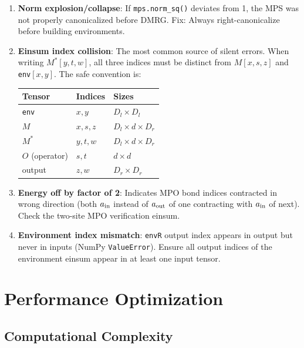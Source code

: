 \documentclass[aps,prb,onecolumn,scriptaddress]{revtex4-2}
\begin{document}
	\begin{enumerate}
		\item \textbf{Norm explosion/collapse}: If \texttt{mps.norm\_sq()} deviates
		from 1, the MPS was not properly canonicalized before DMRG.
		Fix: Always right-canonicalize before building environments.
		
		\item \textbf{Einsum index collision}: The most common source of silent errors.
		When writing $M^*[y,t,w]$, all three indices must be distinct from
		$M[x,s,z]$ and \texttt{env}$[x,y]$.
		The safe convention is:
		\begin{center}
			\begin{tabular}{lll}
				\toprule
				Tensor & Indices & Sizes \\
				\midrule
				\texttt{env} & $x, y$ & $D_l \times D_l$ \\
				$M$ & $x, s, z$ & $D_l \times d \times D_r$ \\
				$M^*$ & $y, t, w$ & $D_l \times d \times D_r$ \\
				$O$ (operator) & $s, t$ & $d \times d$ \\
				output & $z, w$ & $D_r \times D_r$ \\
				\bottomrule
			\end{tabular}
		\end{center}
		
		\item \textbf{Energy off by factor of 2}: Indicates MPO bond indices
		contracted in wrong direction (both $a_{\rm in}$ instead of
		$a_{\rm out}$ of one contracting with $a_{\rm in}$ of next).
		Check the two-site MPO verification einsum.
		
		\item \textbf{Environment index mismatch}: \texttt{envR} output index
		appears in output but never in inputs (NumPy \texttt{ValueError}).
		Ensure all output indices of the environment einsum appear
		in at least one input tensor.
	\end{enumerate}
	
	\section{Performance Optimization}
	
	\subsection{Computational Complexity}
	
\end{document}
